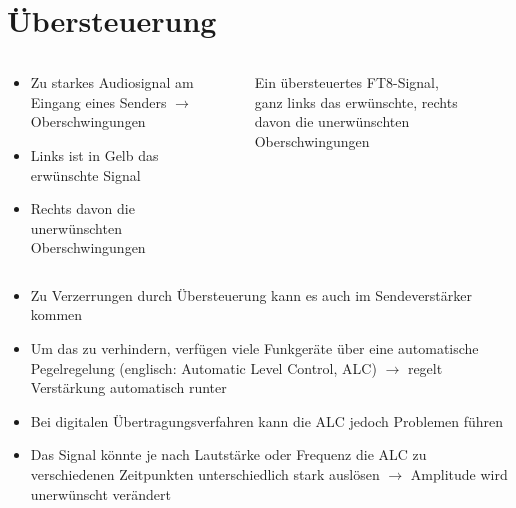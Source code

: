 
\section{Übersteuerung}
\label{section:digimod_uebersteuerung}
\begin{frame}%

\begin{columns}
    \begin{column}{0.48\textwidth}
    \begin{itemize}
  \item Zu starkes Audiosignal am Eingang eines Senders $\rightarrow$ Oberschwingungen
  \item Links ist in Gelb das erwünschte Signal
  \item Rechts davon die unerwünschten Oberschwingungen
  \end{itemize}

    \end{column}
   \begin{column}{0.48\textwidth}
       
\begin{figure}
    \caption{\scriptsize Ein übersteuertes FT8-Signal, ganz links das erwünschte, rechts davon die unerwünschten Oberschwingungen}
    \label{uebersteuerung_ft8}
\end{figure}


   \end{column}
\end{columns}

\end{frame}

\begin{frame}\begin{itemize}
  \item Zu Verzerrungen durch Übersteuerung kann es auch im Sendeverstärker kommen
  \item Um das zu verhindern, verfügen viele Funkgeräte über eine automatische Pegelregelung (englisch: Automatic Level Control, ALC) $\rightarrow$ regelt Verstärkung automatisch runter
  \item Bei digitalen Übertragungsverfahren kann die ALC jedoch Problemen führen
  \item Das Signal könnte je nach Lautstärke oder Frequenz die ALC zu verschiedenen Zeitpunkten unterschiedlich stark auslösen $\rightarrow$ Amplitude wird unerwünscht verändert
  \end{itemize}

\end{frame}

